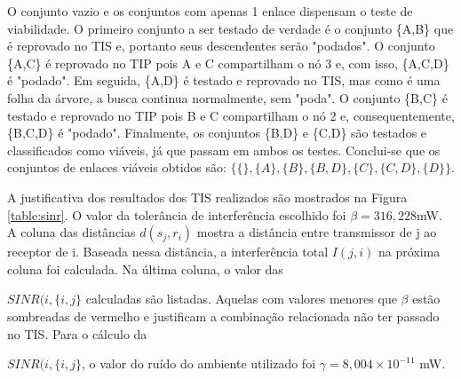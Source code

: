 O conjunto vazio e os conjuntos com apenas 1 enlace dispensam o teste de viabilidade. O primeiro conjunto a ser testado de verdade é o conjunto \{A,B\} que é reprovado no TIS e, portanto seus descendentes serão "podados". O conjunto \{A,C\} é reprovado no TIP pois A e C compartilham o nó 3 e, com isso, \{A,C,D\} é "podado". Em seguida, \{A,D\} é testado e reprovado no TIS, mas como é uma folha da árvore, a busca continua normalmente, sem "poda". O conjunto \{B,C\} é testado e reprovado no TIP pois B e C compartilham o nó 2 e, consequentemente, \{B,C,D\} é "podado". Finalmente, os conjuntos \{B,D\} e \{C,D\} são testados e classificados como viáveis, já que passam em ambos os testes.
Conclui-se que os conjuntos de enlaces viáveis obtidos são: $\{\{\},\{A\},\{B\},\{B,D\},\{C\},\{C,D\},\{D\}\}$. 

A justificativa dos resultados dos TIS realizados são mostrados na Figura \ref{table:sinr}. O valor da tolerância de interferência escolhido foi $\beta=316,228$mW. A coluna das distâncias $d(s_j,r_i)$ mostra a distância entre transmissor de j ao receptor de i. Baseada nessa distância, a interferência total $I(j,i)$ na próxima coluna foi calculada. Na última coluna, o valor das {$SINR(i, \{i,j\}$  calculadas são listadas. Aquelas com valores menores que $\beta$ estão sombreadas de vermelho e justificam a combinação relacionada não ter passado no TIS. Para o cálculo da {$SINR(i, \{i,j\}$, o valor do ruído do ambiente utilizado foi $\gamma=8,004 \times 10^{-11}$ mW.

}}
